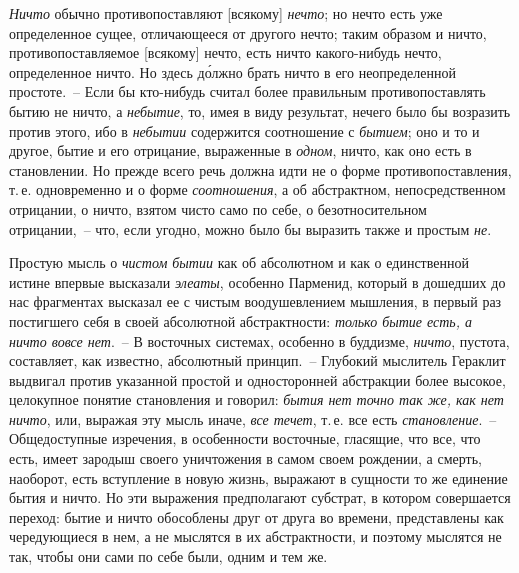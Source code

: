 \emph{Ничто} обычно противопоставляют [всякому] \emph{нечто}; но
нечто есть уже определенное сущее, отличающееся от
другого нечто; таким образом и ничто, противопоставляемое
[всякому] нечто, есть ничто какого-нибудь нечто,
определенное ничто. Но здесь д\'олжно брать ничто в его
неопределенной простоте.~-- Если бы кто-нибудь считал
более правильным противопоставлять бытию не ничто,
а \emph{небытие}, то, имея в виду результат, нечего было бы
возразить против этого, ибо в \emph{небытии} содержится соотношение
с \emph{бытием}; оно и то и другое, бытие и его отрицание,
выраженные в \emph{одном}, ничто, как оно есть в становлении.
Но прежде всего речь должна идти не о форме
противопоставления, т.\,е. одновременно и о форме \emph{соотношения},
а об абстрактном, непосредственном отрицании,
о ничто, взятом чисто само по себе, о безотносительном
отрицании,~-- что, если угодно, можно было бы выразить
также и простым \emph{не}.

Простую мысль о \emph{чистом бытии} как об абсолютном
и как о единственной истине впервые высказали \emph{элеаты},
особенно Парменид, который в дошедших до нас фрагментах
высказал ее с чистым воодушевлением мышления,
в первый раз постигшего себя в своей абсолютной абстрактности:
\emph{только бытие есть, а ничто вовсе нет}.~--
В восточных системах, особенно в буддизме, \emph{ничто}, пустота,
составляет, как известно, абсолютный принцип.~--
Глубокий мыслитель Гераклит выдвигал против указанной
простой и односторонней абстракции более высокое,
целокупное понятие становления и говорил: \emph{бытия нет
точно так же, как нет ничто}, или, выражая эту мысль
иначе, \emph{все течет}, т.\,е. все есть \emph{становление}.~-- Общедоступные
изречения, в особенности восточные, гласящие,
что все, что есть, имеет зародыш своего уничтожения
в самом своем рождении, а смерть, наоборот, есть вступление
в новую жизнь, выражают в сущности то же единение
бытия и ничто. Но эти выражения предполагают
субстрат, в котором совершается переход: бытие и ничто
обособлены друг от друга во времени, представлены как
чередующиеся в нем, а не мыслятся в их абстрактности,
и поэтому мыслятся не так, чтобы они сами по себе были,
одним и тем же.

